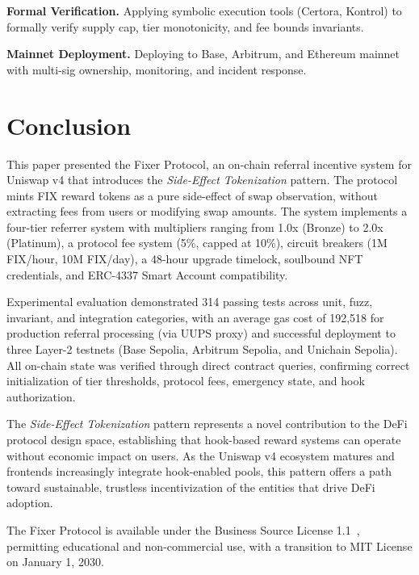 \documentclass[conference]{IEEEtran}
\begin{document}
\textbf{Formal Verification.} Applying symbolic execution tools (Certora, Kontrol) to formally verify supply cap, tier monotonicity, and fee bounds invariants.

\textbf{Mainnet Deployment.} Deploying to Base, Arbitrum, and Ethereum mainnet with multi-sig ownership, monitoring, and incident response.

\section{Conclusion}
\label{sec:conclusion}

This paper presented the Fixer Protocol, an on-chain referral incentive system for Uniswap v4 that introduces the \textit{Side-Effect Tokenization} pattern. The protocol mints FIX reward tokens as a pure side-effect of swap observation, without extracting fees from users or modifying swap amounts. The system implements a four-tier referrer system with multipliers ranging from 1.0x (Bronze) to 2.0x (Platinum), a protocol fee system (5\%, capped at 10\%), circuit breakers (1M FIX/hour, 10M FIX/day), a 48-hour upgrade timelock, soulbound NFT credentials, and ERC-4337 Smart Account compatibility.

Experimental evaluation demonstrated 314 passing tests across unit, fuzz, invariant, and integration categories, with an average gas cost of 192,518 for production referral processing (via UUPS proxy) and successful deployment to three Layer-2 testnets (Base Sepolia, Arbitrum Sepolia, and Unichain Sepolia). All on-chain state was verified through direct contract queries, confirming correct initialization of tier thresholds, protocol fees, emergency state, and hook authorization.

The \textit{Side-Effect Tokenization} pattern represents a novel contribution to the DeFi protocol design space, establishing that hook-based reward systems can operate without economic impact on users. As the Uniswap v4 ecosystem matures and frontends increasingly integrate hook-enabled pools, this pattern offers a path toward sustainable, trustless incentivization of the entities that drive DeFi adoption.

The Fixer Protocol is available under the Business Source License 1.1~\cite{busl}, permitting educational and non-commercial use, with a transition to MIT License on January 1, 2030.
\end{document}

